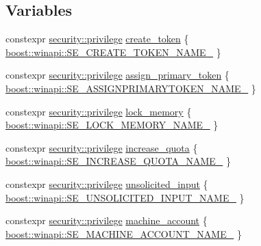 \subsection*{Variables}
\begin{DoxyCompactItemize}
\item 
constexpr \mbox{\hyperlink{classdistant_1_1security_1_1privilege}{security\+::privilege}} \mbox{\hyperlink{namespacedistant_1_1security_1_1privileges_acb43208e9d4a7faf9cde7f225e4c4e28}{create\+\_\+token}} \{ \mbox{\hyperlink{namespaceboost_1_1winapi_ad8f53b422f0b245e13d081fe58ab9534}{boost\+::winapi\+::\+S\+E\+\_\+\+C\+R\+E\+A\+T\+E\+\_\+\+T\+O\+K\+E\+N\+\_\+\+N\+A\+M\+E\+\_\+}} \}
\item 
constexpr \mbox{\hyperlink{classdistant_1_1security_1_1privilege}{security\+::privilege}} \mbox{\hyperlink{namespacedistant_1_1security_1_1privileges_a083e03c406f90c902757d375738e9822}{assign\+\_\+primary\+\_\+token}} \{ \mbox{\hyperlink{namespaceboost_1_1winapi_afe48801f5eea017990b6f74ece34dee4}{boost\+::winapi\+::\+S\+E\+\_\+\+A\+S\+S\+I\+G\+N\+P\+R\+I\+M\+A\+R\+Y\+T\+O\+K\+E\+N\+\_\+\+N\+A\+M\+E\+\_\+}} \}
\item 
constexpr \mbox{\hyperlink{classdistant_1_1security_1_1privilege}{security\+::privilege}} \mbox{\hyperlink{namespacedistant_1_1security_1_1privileges_aa4239f48349b7aa8cd4f266248687e2f}{lock\+\_\+memory}} \{ \mbox{\hyperlink{namespaceboost_1_1winapi_a6ad5ab72230b251b2b046322e78789cb}{boost\+::winapi\+::\+S\+E\+\_\+\+L\+O\+C\+K\+\_\+\+M\+E\+M\+O\+R\+Y\+\_\+\+N\+A\+M\+E\+\_\+}} \}
\item 
constexpr \mbox{\hyperlink{classdistant_1_1security_1_1privilege}{security\+::privilege}} \mbox{\hyperlink{namespacedistant_1_1security_1_1privileges_a070d3b7e1c12c176df1825d3dcf8294d}{increase\+\_\+quota}} \{ \mbox{\hyperlink{namespaceboost_1_1winapi_ae2826f35eefd024e114dead76775929b}{boost\+::winapi\+::\+S\+E\+\_\+\+I\+N\+C\+R\+E\+A\+S\+E\+\_\+\+Q\+U\+O\+T\+A\+\_\+\+N\+A\+M\+E\+\_\+}} \}
\item 
constexpr \mbox{\hyperlink{classdistant_1_1security_1_1privilege}{security\+::privilege}} \mbox{\hyperlink{namespacedistant_1_1security_1_1privileges_ab001cf1ed7b9c15bccb2349cb66cfe72}{unsolicited\+\_\+input}} \{ \mbox{\hyperlink{namespaceboost_1_1winapi_a3a8ca29f0aea4e05eb35ea2349e67d8b}{boost\+::winapi\+::\+S\+E\+\_\+\+U\+N\+S\+O\+L\+I\+C\+I\+T\+E\+D\+\_\+\+I\+N\+P\+U\+T\+\_\+\+N\+A\+M\+E\+\_\+}} \}
\item 
constexpr \mbox{\hyperlink{classdistant_1_1security_1_1privilege}{security\+::privilege}} \mbox{\hyperlink{namespacedistant_1_1security_1_1privileges_aa656368ca1a337a457f4ea433ad40324}{machine\+\_\+account}} \{ \mbox{\hyperlink{namespaceboost_1_1winapi_a2b8e25b827283fdd46322e4798f66794}{boost\+::winapi\+::\+S\+E\+\_\+\+M\+A\+C\+H\+I\+N\+E\+\_\+\+A\+C\+C\+O\+U\+N\+T\+\_\+\+N\+A\+M\+E\+\_\+}} \}

\end{DoxyCompactItemize}
